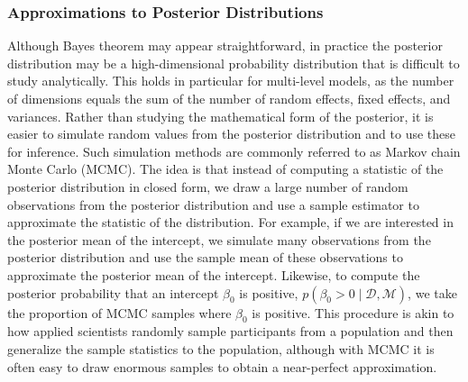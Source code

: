 \documentclass[a4paper]{article}
\newcommand{\prob}[1]{p\left(#1\right)}
\newcommand{\data}{\mathcal{D}}
\newcommand{\model}{\mathcal{M}}
\begin{document}
\subsubsection*{Approximations to Posterior Distributions}
Although Bayes theorem may appear straightforward, in practice the posterior distribution may be a high-dimensional probability distribution that is difficult to study analytically. 
This holds in particular for multi-level models, as the number of dimensions equals the sum of the number of random effects, fixed effects, and variances.
Rather than studying the mathematical form of the posterior, it is easier to simulate random values from the posterior distribution and to use these for inference.
Such simulation methods are commonly referred to as Markov chain Monte Carlo (MCMC).
The idea is that instead of computing a statistic of the posterior distribution in closed form, we draw a large number of random observations from the posterior distribution and use a sample estimator to approximate the statistic of the distribution.
For example, if we are interested in the posterior mean of the intercept, we simulate many observations from the posterior distribution and use the sample mean of these observations to approximate the posterior mean of the intercept.
Likewise, to compute the posterior probability that an intercept $\beta_0$ is positive, $\prob{\beta_0 > 0 \mid \data , \model}$, we take the proportion of MCMC samples where $\beta_0$ is positive.
This procedure is akin to how applied scientists randomly sample participants from a population and then generalize the sample statistics to the population, although with MCMC it is often easy to draw enormous samples to obtain a near-perfect approximation.

\end{document}
